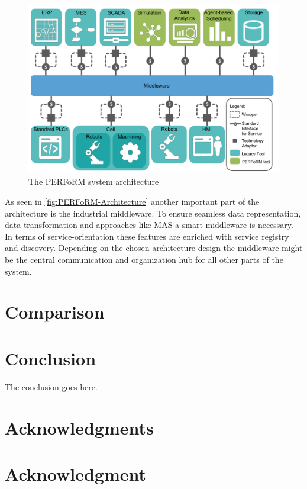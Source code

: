 \documentclass[conference,compsoc,hidelinks]{IEEEtran}
\begin{document}
\begin{figure}[ht]
	\includegraphics[width=\columnwidth]{img/PERFoRM-Architecture.png}
	\caption{The PERFoRM system architecture\cite{SpecPERFoRM}}
	\label{fig:PERFoRM-Architecture}
\end{figure}

As seen in \autoref{fig:PERFoRM-Architecture} another important part of the architecture is the industrial middleware. To ensure seamless data representation, data transformation and approaches like MAS a smart middleware is necessary. In terms of service-orientation these features are enriched with service registry and discovery. Depending on the chosen architecture design the middleware might be the central communication and organization hub for all other parts of the system.

\section{Comparison} \label{sec:comparison} %
\section{Conclusion} %
The conclusion goes here.

\ifCLASSOPTIONcompsoc
  \section*{Acknowledgments}
\else
  \section*{Acknowledgment}
\fi
\end{document}
